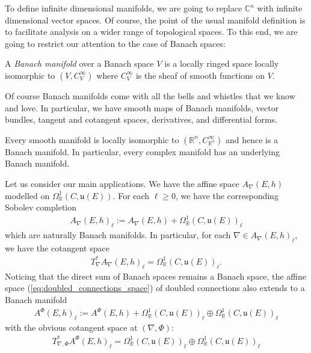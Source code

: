 \documentclass[12pt]{ociamthesis}  %
\begin{document}
To define infinite dimensional manifolds, we are going to replace
$\mathbb{C}^n$ with infinite dimensional vector spaces. Of course,
the point of the usual manifold definition is to facilitate analysis
on a wider range of topological spaces. To this end, we are going to
restrict our attention to the case of Banach spaces:

\begin{definition}
  A \emph{Banach manifold} over a Banach space $V$ is a locally ringed
  space locally isomorphic to $(V,C^\infty_V)$ where $C^\infty_V$ is the
  sheaf of smooth functions on $V$.
\end{definition}

Of course Banach manifolds come with all the bells and whistles that
we know and love. In particular, we have smooth maps of Banach manifolds,
vector bundles, tangent and cotangent spaces, derivatives, and
differential forms. 

\begin{example}
  Every smooth manifold is locally isomorphic to
  $(\mathbb{R}^n,C^\infty_{\mathbb{R}^n})$ and hence is a Banach manifold.
  In particular, every complex manifold has an underlying Banach manifold.
\end{example}

\begin{example}
  Let us consider our main applications. We have the affine space
  $A_\nabla(E,h)$ modelled on $\Omega^1_{\mathbb{R}}(C,\mathfrak u(E))$.
  For each $\ell \geq 0$, we have the corresponding Sobolev completion
  \begin{align*}
    A_\nabla(E,h)_\ell := A_\nabla(E,h) + \Omega^1_{\mathbb{R}}(C,\mathfrak u(E))_\ell
  \end{align*}
  which are naturally Banach manifolds.
  In particular, for each $\nabla\in A_\nabla(E,h)_\ell$, we have the
  cotangent space
  \begin{align*}
    T^*_\nabla A_\nabla(E,h)_\ell
    = \Omega^1_{\mathbb{R}}(C,\mathfrak u(E))_\ell.
  \end{align*}
  Noticing that the direct sum of Banach spaces remains a Banach space,
  the affine space (\ref{eq:doubled_connections_space}) of doubled connections also
  extends to a Banach manifold
  \begin{align*}
    A^\Phi(E,h)_\ell := A^\Phi(E,h) + \Omega^1_{\mathbb{R}}(C,\mathfrak u(E))_\ell
    \oplus \Omega^1_{\mathbb{R}}(C,\mathfrak u(E))_\ell
  \end{align*}
  with the obvious cotangent space at $(\nabla,\Phi)$:
  \begin{align*}
    T^*_{\nabla,\Phi} A^\Phi(E,h)_\ell
    = \Omega^1_{\mathbb{R}}(C,\mathfrak u(E))_\ell
    \oplus \Omega^1_{\mathbb{R}}(C,\mathfrak u(E))_\ell
  \end{align*}
\end{example}
\end{document}
